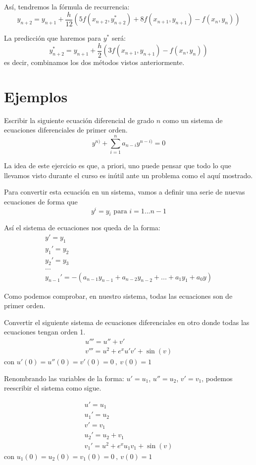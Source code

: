 Así, tendremos la fórmula de recurrencia:
\[y_{n+2} = y_{n+1} + \frac{h}{12}\left( 5f(x_{n+2},y_{n+2}^*)+8f(x_{n+1},y_{n+1})-f(x_n,y_n)\right)\]

La predicción que haremos para $y^*$ será:
\[y_{n+2}^* = y_{n+1} + \frac{h}{2} \left( 3f(x_{n+1},y_{n+1})-f(x_n,y_n)\right)\]
es decir, combinamos los dos métodos vistos anteriormente.

\section{Ejemplos}

\begin{problem}[1]
Escribir la siguiente ecuación diferencial de grado $n$ como un sistema de ecuaciones diferenciales de primer orden.
\[y^{n)} + \sum_{i=1}^n a_{n-i}y^{n-i)} = 0\]

\solution
La idea de este ejercicio es que, a priori, uno puede pensar que todo lo que llevamos visto durante el curso es inútil ante un problema como el aquí mostrado.

Para convertir esta ecuación en un sistema, vamos a definir una serie de nuevas ecuaciones de forma que
\[y^{i} = y_i \text{ para } i=1...n-1\]

Así el sistema de ecuaciones nos queda de la forma:
\[\begin{array}{l}
y' = y_1\\
y_1' = y_2\\
y_2' = y_3 \\
...\\
y_{n-1}' = -\left( a_{n-1}y_{n-1} + a_{n-2}y_{n-2}+...+a_1y_1 + a_0 y\right)
\end{array} \]

Como podemos comprobar, en nuestro sistema, todas las ecuaciones son de primer orden.

\end{problem}

\begin{problem}[2]
Convertir el siguiente sistema de ecuaciones diferenciales en otro donde todas las ecuaciones tengan orden 1.
\[\begin{array}{l}
u''' = u''+v'\\
v''' = u^2+e^xu'v'+\sin(v)
\end{array} \]
con $u'(0)=u''(0)=v'(0)=0 \ , \ v(0)=1$
\solution

Renombrando las variables de la forma: $u' = u_1$, $u''=u_2$, $v'=v_1$, podemos reescribir el sistema como sigue.

\[\begin{array}{l}
u' = u_1\\
u_1'=u_2\\
v'=v_1\\
u_2' = u_2+v_1\\
v_1' = u^2+e^xu_1v_1 + \sin(v)
\end{array} \]
con $u_1(0)=u_2(0)=v_1(0)=0 \ , \ v(0)=1$

\end{problem}

